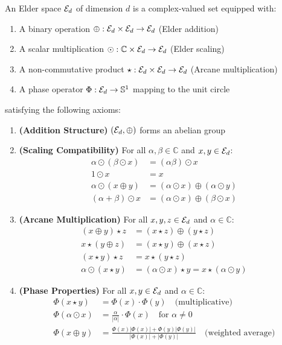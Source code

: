\begin{definition}
An Elder space $\mathcal{E}_{d}$ of dimension $d$ is a complex-valued set equipped with:
\begin{enumerate}
    \item A binary operation $\oplus: \mathcal{E}_{d} \times \mathcal{E}_{d} \rightarrow \mathcal{E}_{d}$ (Elder addition)
    \item A scalar multiplication $\odot: \mathbb{C} \times \mathcal{E}_{d} \rightarrow \mathcal{E}_{d}$ (Elder scaling)
    \item A non-commutative product $\star: \mathcal{E}_{d} \times \mathcal{E}_{d} \rightarrow \mathcal{E}_{d}$ (Arcane multiplication)
    \item A phase operator $\Phi: \mathcal{E}_{d} \rightarrow \mathbb{S}^1$ mapping to the unit circle
\end{enumerate}
satisfying the following axioms:
\begin{enumerate}[label=\textbf{A\arabic*}]
    \item \textbf{(Addition Structure)} $(\mathcal{E}_{d}, \oplus)$ forms an abelian group
    \item \textbf{(Scaling Compatibility)} For all $\alpha, \beta \in \mathbb{C}$ and $x, y \in \mathcal{E}_{d}$:
    \begin{align}
        \alpha \odot (\beta \odot x) &= (\alpha\beta) \odot x\\
        1 \odot x &= x\\
        \alpha \odot (x \oplus y) &= (\alpha \odot x) \oplus (\alpha \odot y)\\
        (\alpha + \beta) \odot x &= (\alpha \odot x) \oplus (\beta \odot x)
    \end{align}
    
    \item \textbf{(Arcane Multiplication)} For all $x, y, z \in \mathcal{E}_{d}$ and $\alpha \in \mathbb{C}$:
    \begin{align}
        (x \oplus y) \star z &= (x \star z) \oplus (y \star z)\\
        x \star (y \oplus z) &= (x \star y) \oplus (x \star z)\\
        (x \star y) \star z &= x \star (y \star z)\\
        \alpha \odot (x \star y) &= (\alpha \odot x) \star y = x \star (\alpha \odot y)
    \end{align}
    
    \item \textbf{(Phase Properties)} For all $x, y \in \mathcal{E}_{d}$ and $\alpha \in \mathbb{C}$:
    \begin{align}
        \Phi(x \star y) &= \Phi(x) \cdot \Phi(y) \quad \text{(multiplicative)}\\
        \Phi(\alpha \odot x) &= \frac{\alpha}{|\alpha|} \cdot \Phi(x) \quad \text{for } \alpha \neq 0\\
        \Phi(x \oplus y) &= \frac{\Phi(x)|\Phi(x)| + \Phi(y)|\Phi(y)|}{|\Phi(x)| + |\Phi(y)|} \quad \text{(weighted average)}
    \end{align}
\end{enumerate}
\end{definition}

